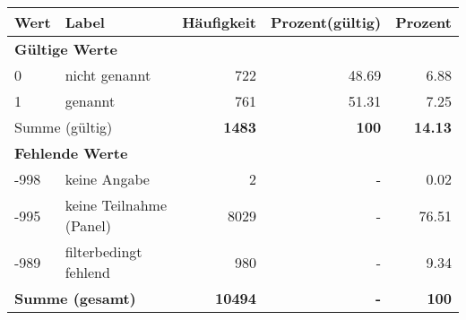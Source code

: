      \begin{longtable}{lXrrr}
     \toprule
     \textbf{Wert} & \textbf{Label} & \textbf{Häufigkeit} & \textbf{Prozent(gültig)} & \textbf{Prozent} \\
     \endhead
     \midrule
     \multicolumn{5}{l}{\textbf{Gültige Werte}}\\

     0 &
     \multicolumn{1}{X}{ nicht genannt   } &


       \num{722} &
       \num[round-mode=places,round-precision=2]{48,69} &
         \num[round-mode=places,round-precision=2]{6,88} \\

     1 &
     \multicolumn{1}{X}{ genannt   } &


       \num{761} &
       \num[round-mode=places,round-precision=2]{51,31} &
         \num[round-mode=places,round-precision=2]{7,25} \\
     \midrule
     \multicolumn{2}{l}{Summe (gültig)} &
       \textbf{\num{1483}} &
     \textbf{100} &
       \textbf{\num[round-mode=places,round-precision=2]{14,13}} \\
     \multicolumn{5}{l}{\textbf{Fehlende Werte}}\\
       -998 &
       keine Angabe &
         \num{2} &
        - &
         \num[round-mode=places,round-precision=2]{0,02} \\
       -995 &
       keine Teilnahme (Panel) &
         \num{8029} &
        - &
         \num[round-mode=places,round-precision=2]{76,51} \\
       -989 &
       filterbedingt fehlend &
         \num{980} &
        - &
         \num[round-mode=places,round-precision=2]{9,34} \\
     \midrule
     \multicolumn{2}{l}{\textbf{Summe (gesamt)}} &
          \textbf{\num{10494}} &
        \textbf{-} &
        \textbf{100} \\
     \bottomrule
     \end{longtable}
     
